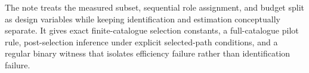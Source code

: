 The note treats the measured subset, sequential role assignment, and budget split as design variables while keeping identification and estimation conceptually separate. It gives exact finite-catalogue selection constants, a full-catalogue pilot rule, post-selection inference under explicit selected-path conditions, and a regular binary witness that isolates efficiency failure rather than identification failure.